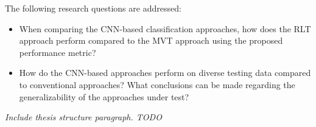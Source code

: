 
The following research questions are addressed: 
\begin{itemize}
    \item When comparing the CNN-based classification approaches, how does the RLT approach perform compared to the MVT 
    approach using the proposed performance metric? 

    \item How do the CNN-based approaches perform on diverse testing data compared to conventional approaches?
    What conclusions can be made regarding the generalizability of the approaches under test?
    
\end{itemize}


\textit{Include thesis structure paragraph. TODO}

